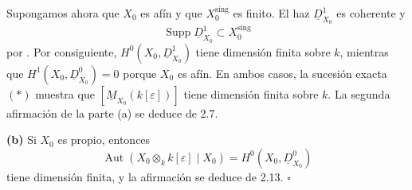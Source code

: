 Supongamos ahora que $X_0$ es afín y que
$X_0^{\mathrm{sing}}$ es finito. El haz
$\underline D^1_{X_0}$ es coherente y
\[
\operatorname{Supp}\underline D^1_{X_0}
\subset X_0^{\mathrm{sing}}
\]
por . Por consiguiente,
$H^0(X_0,\underline D^1_{X_0})$ tiene dimensión finita sobre $k$,
mientras que $H^1(X_0,\underline D^0_{X_0})=0$ porque $X_0$ es afín.
En ambos casos, la sucesión exacta $(*)$ muestra que
$[\underline M_{X_0}(k[\varepsilon])]$ tiene dimensión finita sobre
$k$. La segunda afirmación de la parte (a) se deduce de 2.7.

\smallskip
\noindent\textbf{(b)} Si $X_0$ es propio, entonces
\[
\operatorname{Aut}(X_0\otimes_k k[\varepsilon]\mid X_0)
=H^0(X_0,\underline D^0_{X_0})
\]
tiene dimensión finita, y la afirmación se deduce de 2.13.
\hfill$\square$
